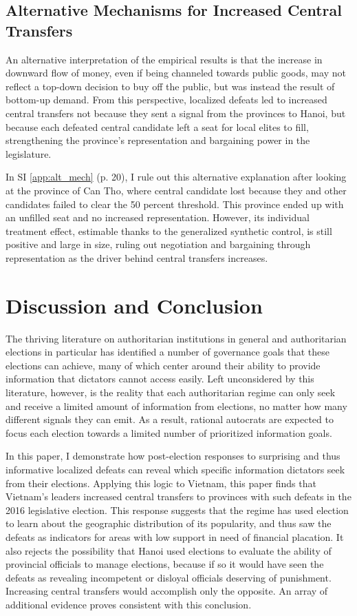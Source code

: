 \documentclass[12pt]{article}
\newcommand{\1}{\mathbbm{1}}
\begin{document}
\subsection{Alternative Mechanisms for Increased Central Transfers}

An alternative interpretation of the empirical results is that the increase in downward flow of money, even if being channeled towards public goods, may not reflect a top-down decision to buy off the public, but was instead the result of bottom-up demand. From this perspective, localized defeats led to increased central transfers not because they sent a signal from the provinces to Hanoi, but because each defeated central candidate left a seat for local elites to fill, strengthening the province's representation and bargaining power in the legislature.

In SI \ref{app:alt_mech} (p. 20), I rule out this alternative explanation after looking at the province of Can Tho, where central candidate lost because they and other candidates failed to clear the 50 percent threshold. This province ended up with an unfilled seat and no increased representation. However, its individual treatment effect, estimable thanks to the generalized synthetic control, is still positive and large in size, ruling out negotiation and bargaining through representation as the driver behind central transfers increases.

\section{Discussion and Conclusion}

The thriving literature on authoritarian institutions in general and authoritarian elections in particular has identified a number of governance goals that these elections can achieve, many of which center around their ability to provide information that dictators cannot access easily. Left unconsidered by this literature, however, is the reality that each authoritarian regime can only seek and receive a limited amount of information from elections, no matter how many different signals they can emit. As a result, rational autocrats are expected to focus each election towards a limited number of prioritized information goals.

In this paper, I demonstrate how post-election responses to surprising and thus informative localized defeats can reveal which specific information dictators seek from their elections. Applying this logic to Vietnam, this paper finds that Vietnam's leaders increased central transfers to provinces with such defeats in the 2016 legislative election. This response suggests that the regime has used election to learn about the geographic distribution of its popularity, and thus saw the defeats as indicators for areas with low support in need of financial placation. It also rejects the possibility that Hanoi used elections to evaluate the ability of provincial officials to manage elections, because if so it would have seen the defeats as revealing incompetent or disloyal officials deserving of punishment. Increasing central transfers would accomplish only the opposite. An array of additional evidence proves consistent with this conclusion.
\end{document}
